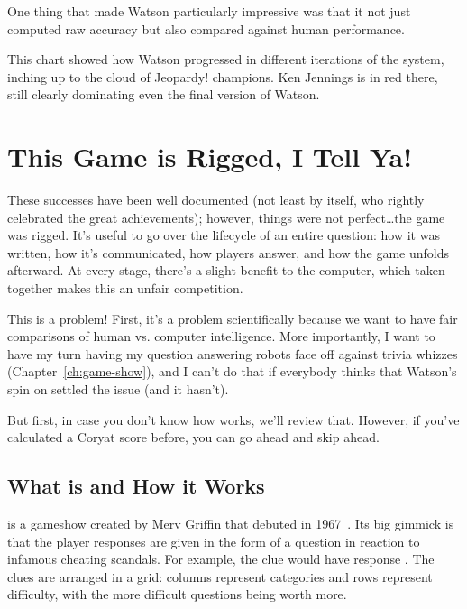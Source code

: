 One thing that made Watson particularly impressive was that it not just computed raw accuracy but also compared against human performance.  

This chart showed how Watson progressed in different iterations of the system, inching up to the cloud of Jeopardy! champions.  Ken Jennings is in red there, still clearly dominating even the final version of Watson.

\section{This Game is Rigged, I Tell Ya!}

These successes have been well documented (not least by 
itself, who rightly celebrated the great achievements); however,
things were not perfect\dots the game was rigged.
%
It's useful to go over the lifecycle of an entire question: how it was
written, how it's communicated, how players answer, and how the game
unfolds afterward.
%
At every stage, there's a slight benefit to the computer, which taken
together makes this an unfair competition.

This is a problem!  First, it's a problem scientifically because we
want to have fair comparisons of human vs. computer intelligence.
%
More importantly, I want to have my turn having my question answering
robots face off against trivia whizzes (Chapter~\ref{ch:game-show}),
and I can't do that if everybody thinks that Watson's spin
on \jeopardy{} settled the issue (and it hasn't).


But first, in case you don't know how \jeopardy{} works, we'll review
that.
%
However, if you've calculated a Coryat score before, you can go ahead
and skip ahead.

\subsection{What \jeopardy{} is and How it Works}

\jeopardy{} is a gameshow created by Merv Griffin that debuted in 1967~\citep{griffin-03}.
%
Its big gimmick is that the player responses are given in the form of
a question in reaction to infamous cheating scandals.
%
For example, the clue
would have response .
%
%
The clues are arranged in a grid: columns represent categories and
rows represent difficulty, with the more difficult questions being
worth more.

